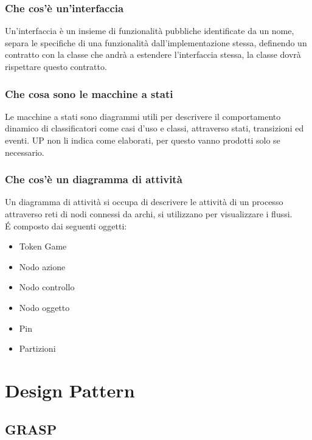 \documentclass[12pt, a4paper, openany]{book}
\begin{document}
\subsection*{Che cos'è un'interfaccia}
Un'interfaccia è un insieme di funzionalità pubbliche identificate da un nome,
separa le specifiche di una funzionalità dall'implementazione stessa, definendo un contratto
con la classe che andrà a estendere l'interfaccia stessa, la classe dovrà rispettare questo
contratto.

\subsection*{Che cosa sono le macchine a stati}
Le macchine a stati sono diagrammi utili per descrivere il comportamento
dinamico di classificatori come casi d'uso e classi, attraverso stati, transizioni
ed eventi. UP non li indica come elaborati, per questo vanno prodotti solo
se necessario.

\subsection*{Che cos'è un diagramma di attività}
Un diagramma di attività si occupa di descrivere le attività di un processo attraverso
reti di nodi connessi da archi, si utilizzano per visualizzare i flussi.\\
\'E composto dai seguenti oggetti:
\begin{itemize}
    \item Token Game
    \item Nodo azione 
    \item Nodo controllo
    \item Nodo oggetto
    \item Pin
    \item Partizioni
\end{itemize}

\chapter{Design Pattern}

\section{GRASP}
\end{document}
